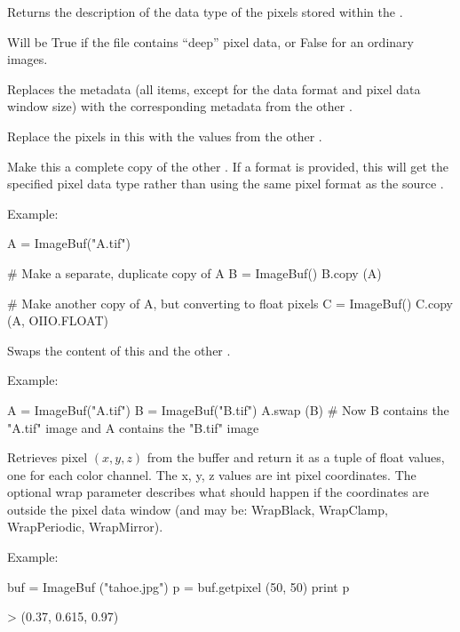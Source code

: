 Returns the description of the data type of the pixels stored within the
\ImageBuf.
\apiend

Will be {\cf True} if the file contains ``deep'' pixel data, or {\cf False}
for an ordinary images.
\apiend

Replaces the metadata (all \ImageSpec items, except for the data format
and pixel data window size) with the corresponding metadata from the
other \ImageBuf.
\apiend

Replace the pixels in this \ImageBuf with the values from the other
\ImageBuf.
\apiend

Make this \ImageBuf a complete copy of the other \ImageBuf.
If a {\cf format} is provided, {\cf this} will get the specified pixel
data type rather than using the same pixel format as the source \ImageBuf.

\noindent Example:
\begin{code}
    A = ImageBuf("A.tif")

    # Make a separate, duplicate copy of A
    B = ImageBuf()
    B.copy (A)

    # Make another copy of A, but converting to float pixels
    C = ImageBuf()
    C.copy (A, OIIO.FLOAT)
\end{code}
\apiend

Swaps the content of this \ImageBuf and the other \ImageBuf.

\noindent Example:
\begin{code}
    A = ImageBuf("A.tif")
    B = ImageBuf("B.tif")
    A.swap (B)
    # Now B contains the "A.tif" image and A contains the "B.tif" image
\end{code}
\apiend

Retrieves pixel $(x,y,z)$ from the buffer and return it as a tuple of
{\cf float} values, one for each color channel.  The {\cf x, y, z} values
are {\cf int} pixel coordinates.  The optional {\cf wrap} parameter
describes what should happen if the coordinates are outside the pixel data
window (and may be: {\cf WrapBlack, WrapClamp, WrapPeriodic, WrapMirror}).

\noindent Example:
\begin{code}
    buf = ImageBuf ("tahoe.jpg")
    p = buf.getpixel (50, 50)
    print p

    > (0.37, 0.615, 0.97)
\end{code}
\apiend


